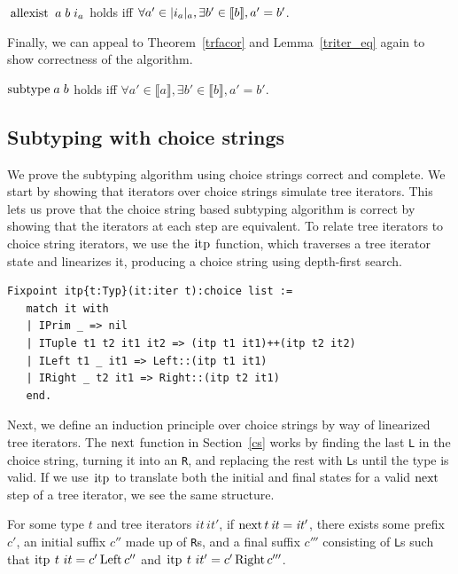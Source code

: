 \documentclass[a4paper,english]{lipics-v2019}
\newcommand{\denotes}[1]{\llbracket #1 \rrbracket}
\renewcommand{\L}{{\tt L}\xspace}
\newcommand{\Ls}{{\tt L}s\xspace}
\newcommand{\R}{{\tt R}\xspace}
\newcommand{\Rs}{{\tt R}s\xspace}
\renewcommand{\c}[1]{\ensuremath{\text{\lstinline{#1}}}\xspace}
\begin{document}
\begin{theorem}\label{trfacor}
$\c{allexist}\;a\;b\;i_a$ holds iff $\forall a'\in \irch{i_a}{a},
  \exists b'\in \denotes{b}, a'= b'$.
\end{theorem}

\noindent
Finally, we can appeal to Theorem~\ref{trfacor} and Lemma~\ref{triter_eq}
again to show correctness of  the algorithm.

\begin{theorem}
$\c{subtype}\;a\;b$ holds iff $\forall a' \in \denotes{a}, \exists b' \in
  \denotes{b}, a' = b'$.
\end{theorem}

\subsection{Subtyping with choice strings}

We prove the subtyping algorithm using choice strings correct and complete. We
start by showing that iterators over choice strings simulate tree iterators. 
This lets us prove that the choice string based subtyping algorithm is correct
by showing that the iterators at each step are equivalent.
To relate tree iterators to choice string iterators, we use the \c{itp}
function, which traverses a tree iterator state and linearizes it, producing a
choice string using depth-first search.


\begin{lstlisting}
Fixpoint itp{t:Typ}(it:iter t):choice list :=
   match it with
   | IPrim _ => nil
   | ITuple t1 t2 it1 it2 => (itp t1 it1)++(itp t2 it2)
   | ILeft t1 _ it1 => Left::(itp t1 it1)
   | IRight _ t2 it1 => Right::(itp t2 it1)
   end.
\end{lstlisting}

\noindent Next, we define an induction principle over choice strings by way of
linearized tree iterators. The \c{next} function in Section~\ref{cs} works by
finding the last \L in the choice string, turning it into an \R, and replacing
the rest with \Ls until the type is valid. If we use \c{itp} to translate
both the initial and final states for a valid \c{next} step of a tree
iterator, we see the same structure.

\begin{lemma}
\label{lem:snt}
For some type $t$ and tree iterators $\mathit{it}\,\mathit{it}'$, if
$\c{next}\,t\,\mathit{it}=\mathit{it'}$, there exists some prefix  $c'$, an
initial suffix $c''$ made up of \Rs, and a final suffix  $c'''$
consisting of \Ls such that $\c{itp}~t~it=c'\,\c{Left}\,c''$ and 
$\c{itp}~t~it'=c'\,\c{Right}\,c'''$.
\end{lemma}
\end{document}
